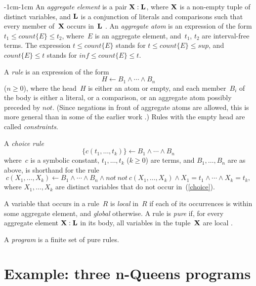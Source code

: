 \documentclass[11pt]{article}
\def\ar{\leftarrow}
\def\beq{\begin{equation}}
\def\eeq#1{\label{#1}\end{equation}}
\def\ba{\begin{array}}
\def\ea{\end{array}}
\def\bfx{{\bf X}}
\newcommand{\co}{\ensuremath{\mathit{count}}}
\newcommand{\no}{\ensuremath{\mathit{not}}}
\begin{document}
\begin{adjustwidth}{-1cm}{-1cm}
An \emph{aggregate element} is a pair
$\bfx:{\bf L}$,
where $\bfx$ is a non-empty tuple of distinct variables,
and $\bf L$ is a conjunction of
literals and comparisons such that every member of~$\bfx$ occurs in~$\bf L$
\cite[Section~4]{lif22a}.  An \emph{aggregate atom} is an expression of
the form $t_1\leq \co \{E\}\leq t_2$,
where~$E$ is an aggregate element, and~$t_1$, $t_2$ are interval-free terms.
The expression $t\leq \co \{E\}$ stands for $t\leq \co \{E\}\leq
\mathit{sup}$, and $\co \{E\}\leq t$ stands for $\mathit{inf}\leq
\co \{E\}\leq t$.

A \emph{rule} is an expression of the form
\beq
H \ar B_1\land\cdots\land B_n
\eeq{rule}
($n\geq 0$), where the head~$H$ is either an atom or empty, and
each member~$B_i$ of the body is either a literal, or a comparison,
or an aggregate atom possibly preceded by \no.  (Since negations in front of
aggregate atoms are allowed, this is more general than in some of the
earlier work \cite{lif22a,fan24}.)  Rules with the empty head are called
\emph{constraints}.

A \emph{choice rule}
\beq
\{c(t_1,\dots,t_k)\}\ar B_1\land\cdots\land B_n
\eeq{choice}
where~$c$ is a symbolic constant, $t_1,\dots,t_k$ ($k\geq 0$) are terms, and
$B_1,\dots,B_n$ are as above, is shorthand for the rule
$$%
c(X_1,\dots,X_k)
\ar B_1\land\cdots\land B_n\land\no\ \no\ c(X_1,\dots,X_k)%
\land X_1=t_1\land\cdots\land X_k=t_k,
$$
where $X_1,\dots,X_k$ are distinct variables that do not occur
in~(\ref{choice}).

A variable that occurs in a rule~$R$ is \emph{local} in~$R$ if each of
its occurrences is within some aggregate element, and \emph{global} otherwise.
A rule is \emph{pure} if, for every aggregate element $\bfx:{\bf L}$ in its
body, all variables in the tuple~$\bfx$ are local \cite[Section~4]{lif22a}.

A \emph{program} is a finite set of pure rules.

\section{Example: three n-Queens programs}\label{sec:examples}


\end{adjustwidth}
\end{document}
